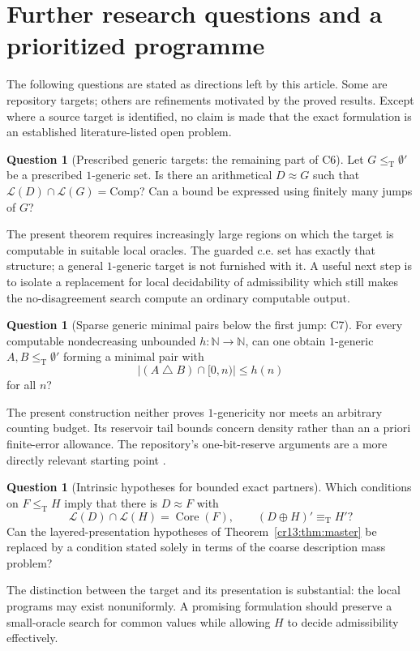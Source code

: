 \documentclass[11pt,letterpaper]{article}
\theoremstyle{definition}
\newtheorem{question}[theorem]{Question}
\theoremstyle{remark}\newtheorem{remark}[theorem]{Remark}
\numberwithin{equation}{section}
\newcommand{\N}{\mathbb N}
\newcommand{\leT}{\leq_{\mathrm T}}
\newcommand{\eqT}{\equiv_{\mathrm T}}
\newcommand{\Low}{\mathcal L}
\newcommand{\Core}{\operatorname{Core}}
\newcommand{\Comp}{\mathrm{Comp}}
\newcommand{\sd}{\mathbin{\triangle}}
\begin{document}
\section{Further research questions and a prioritized programme}
\label{cr13:sec:future}
The following questions are stated as directions left by this article. Some are repository targets; others are refinements motivated by the proved results. Except where a source target is identified, no claim is made that the exact formulation is an established literature-listed open problem.

\begin{question}[Prescribed generic targets: the remaining part of C6]\label{cr13:q:generic}
Let $G\leT\emptyset'$ be a prescribed $1$-generic set. Is there an arithmetical $D\approx G$ such that $\Low(D)\cap\Low(G)=\Comp$? Can a bound be expressed using finitely many jumps of $G$?
\end{question}
The present theorem requires increasingly large regions on which the target is computable in suitable local oracles. The guarded c.e. set has exactly that structure; a general $1$-generic target is not furnished with it. A useful next step is to isolate a replacement for local decidability of admissibility which still makes the no-disagreement search compute an ordinary computable output.

\begin{question}[Sparse generic minimal pairs below the first jump: C7]\label{cr13:q:c7}
For every computable nondecreasing unbounded $h:\N\to\N$, can one obtain $1$-generic $A,B\leT\emptyset'$ forming a minimal pair with
\[
                   |(A\sd B)\cap[0,n)|\le h(n)
\]
for all $n$?
\end{question}
The present construction neither proves $1$-genericity nor meets an arbitrary counting budget. Its reservoir tail bounds concern density rather than an a priori finite-error allowance. The repository's one-bit-reserve arguments are a more directly relevant starting point \cite{Plan,Synthesis}.

\begin{question}[Intrinsic hypotheses for bounded exact partners]\label{cr13:q:intrinsic}
Which conditions on $F\leT H$ imply that there is $D\approx F$ with
\[
  \Low(D)\cap\Low(H)=\Core(F),\qquad (D\oplus H)'\eqT H'?
\]
Can the layered-presentation hypotheses of Theorem~\ref{cr13:thm:master} be replaced by a condition stated solely in terms of the coarse description mass problem?
\end{question}
The distinction between the target and its presentation is substantial: the local programs may exist nonuniformly. A promising formulation should preserve a small-oracle search for common values while allowing $H$ to decide admissibility effectively.
\end{document}
